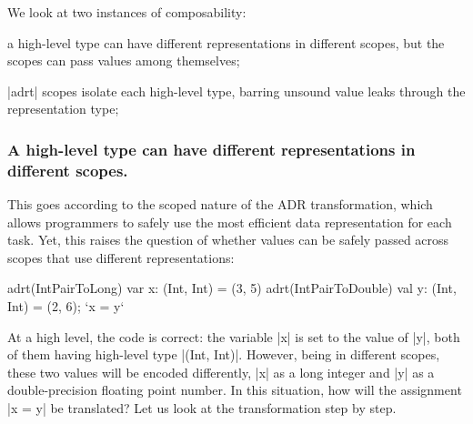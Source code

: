 
We look at two instances of composability:

\begin{compactitem}
  \item a high-level type can have different representations in different scopes, but the scopes can pass values among themselves;
  \item |adrt| scopes isolate each high-level type, barring unsound value leaks through the representation type;
\end{compactitem}

\subsubsection{A high-level type can have different representations in different scopes.} This goes according to the scoped nature of the ADR transformation, which allows programmers to safely use the most efficient data representation for each task. Yet, this raises the question of whether values can be safely passed across scopes that use different representations:

\begin{lstlisting-nobreak}
adrt(IntPairToLong)   { var x: (Int, Int) = (3, 5) }
adrt(IntPairToDouble) { val y: (Int, Int) = (2, 6); `x = y` }
\end{lstlisting-nobreak}

At a high level, the code is correct: the variable |x| is set to the value of |y|, both of them having high-level type |(Int, Int)|. However, being in different scopes, these two values will be encoded differently, |x| as a long integer and |y| as a double-precision floating point number. In this situation, how will the assignment |x = y| be translated? Let us look at the transformation step by step.

